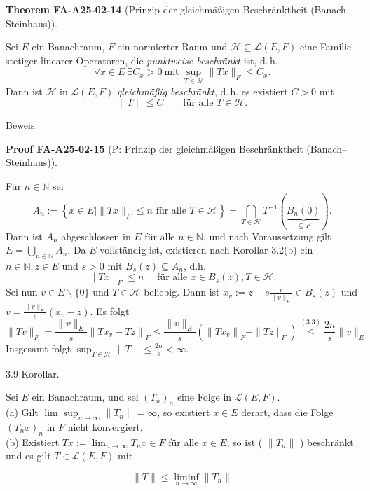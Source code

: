 \documentclass[10pt, letterpaper]{article}
\newcommand{\CustomHeading}[3]{%
  \par\medskip\noindent%
  \textbf{#1 #2} \textnormal{(#3)}.\enskip%
}
\newenvironment{THEO}[2]{\begin{unitbox}\CustomHeading{Theorem}{#1}{#2}}{\end{unitbox}}
\newenvironment{PROOF}[2]{\begin{unitbox}\CustomHeading{Proof}{#1}{#2}}{\end{unitbox}}
\begin{document}
\begin{THEO}{FA-A25-02-14}{Prinzip der gleichmäßigen Beschränktheit (Banach--Steinhaus)}
Sei $E$ ein Banachraum, $F$ ein normierter Raum und $\mathcal{H}\subseteq \mathcal{L}(E,F)$ eine Familie stetiger linearer Operatoren, die \emph{punktweise beschränkt} ist, d.\,h.
\[
\forall x\in E\ \exists C_x>0\ \text{mit}\ \sup_{T\in\mathcal{H}}\|Tx\|_F\le C_x.
\]
Dann ist $\mathcal{H}$ in $\mathcal{L}(E,F)$ \emph{gleichmäßig beschränkt}, d.\,h. es existiert $C>0$ mit
\[
\|T\|\le C\qquad\text{für alle }T\in\mathcal{H}.
\]
\end{THEO}


Beweis. 

\begin{PROOF}{FA-A25-02-15}{P: Prinzip der gleichmäßigen Beschränktheit (Banach--Steinhaus)}
Für $n \in \mathbb{N}$ sei
$$
A_{n}:=\left\{x \in E \mid\|T x\|_{F} \leq n \text { für alle } T \in \mathcal{H}\right\}=\bigcap_{T \in \mathcal{H}} T^{-1}(\underbrace{B_{n}(0)}_{\subseteq F}) .
$$
Dann ist $A_{n}$ abgeschlossen in $E$ für alle $n \in \mathbb{N}$, und nach Voraussetzung gilt $E=\bigcup_{n \in \mathbb{N}} A_{n}$. Da $E$ vollständig ist, existieren nach Korollar 3.2(b) ein $n \in \mathbb{N}, z \in E$ und $s>0$ mit $B_{s}(z) \subseteq A_{n}$, d.h.
$$
\|T x\|_{F} \leq n \quad \text { für alle } x \in B_{s}(z), T \in \mathcal{H} .
$$
Sei nun $v \in E \backslash\{0\}$ und $T \in \mathcal{H}$ beliebig. Dann ist $x_{v}:=z+s \frac{v}{\|v\|_{E}} \in B_{s}(z)$ und $v=\frac{\|v\|_{E}}{s}\left(x_{v}-z\right)$. Es folgt
$$
\|T v\|_{F}=\frac{\|v\|_{E}}{s}\left\|T x_{v}-T z\right\|_{F} \leq \frac{\|v\|_{E}}{s}\left(\left\|T x_{v}\right\|_{F}+\|T z\|_{F}\right) \stackrel{(3.3)}{\leq} \frac{2 n}{s}\|v\|_{E}
$$
Insgesamt folgt $\sup _{T \in \mathcal{H}}\|T\| \leq \frac{2 n}{s}<\infty$.
\end{PROOF}


3.9 Korollar. 


Sei $E$ ein Banachraum, und sei $\left(T_{n}\right)_{n}$ eine Folge in $\mathcal{L}(E, F)$.\\
(a) Gilt $\lim \sup _{n \rightarrow \infty}\left\|T_{n}\right\|=\infty$, so existiert $x \in E$ derart, dass die Folge $\left(T_{n} x\right)_{n}$ in $F$ nicht konvergiert.\\
(b) Existiert $T x:=\lim _{n \rightarrow \infty} T_{n} x \in F$ für alle $x \in E$, so ist ( $\left\|T_{n}\right\|$ ) beschränkt und es gilt $T \in \mathcal{L}(E, F)$ mit

$$
\|T\| \leq \liminf _{n \rightarrow \infty}\left\|T_{n}\right\|
$$
\end{document}
